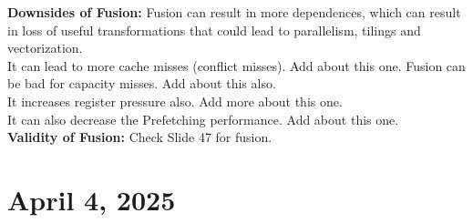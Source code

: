 \documentclass{article}
\begin{document}
\textbf{Downsides of Fusion: }Fusion can result in more dependences, which can result in loss of useful transformations that could lead to parallelism, tilings and vectorization. \\
It can lead to more cache misses (conflict misses). Add about this one. Fusion can be bad for capacity misses. Add about this also. \\
It increases register pressure also. Add more about this one. \\
It can also decrease the Prefetching performance. Add about this one. \\

\textbf{Validity of Fusion: } Check Slide 47 for fusion.

\section*{April 4, 2025}
\end{document}
